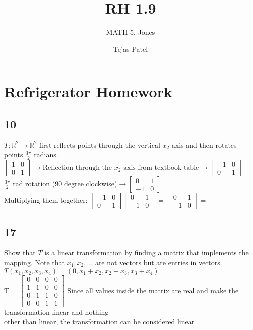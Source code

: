\documentclass{article}
\title{RH 1.9}
\author{MATH 5, Jones}
\date{Tejas Patel}
\begin{document}
\maketitle
\section*{Refrigerator Homework}
\subsection*{10}
 \( T: \mathbb{R}^2 \to \mathbb{R}^2 \) first reflects points through the vertical \( x_2 \)-axis and then rotates points \( \frac{3\pi}{2} \) radians.
\\$\begin{bmatrix}
  1&0\\0&1
\end{bmatrix} \rightarrow \text{Reflection through the $x_2$ axis from textbook table} \rightarrow \begin{bmatrix}
  -1&0\\0&1
\end{bmatrix}$
\\[0.1in]$\frac{3\pi}{2}$ rad rotation (90 degree clockwise)$\rightarrow \begin{bmatrix}
  0&1\\-1&0
\end{bmatrix}$
\\[0.1in]Multiplying them together: 
$\begin{bmatrix}-1&0\\0&1\end{bmatrix} \begin{bmatrix}0&1\\-1&0\end{bmatrix}= 
\begin{bmatrix}0&1\\-1&0\end{bmatrix}=$
\subsection*{17}
Show that \( T \) is a linear transformation by finding a matrix that implements the mapping. Note that \( x_1, x_2, \dots \) are not vectors but are entries in vectors.
\\\( T(x_1, x_2, x_3, x_4) = (0, x_1 + x_2, x_2 + x_3, x_3 + x_4) \)
\\T = $\begin{bmatrix}
  0 & 0 & 0 & 0 \\
  1 & 1 & 0 & 0 \\
  0 & 1 & 1 & 0 \\
  0 & 0 & 1 & 1
  \end{bmatrix}$ Since all values inside the matrix are real and make the transformation linear and nothing \\[0.05in]other than linear, the transformation can be considered linear
\end{document}

